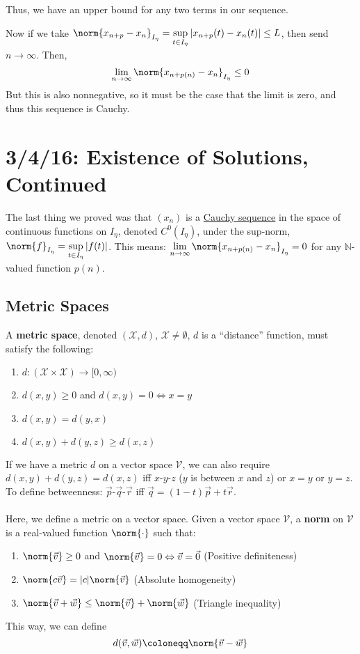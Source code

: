 \documentclass[12pt]{article}
\begin{document}
Thus, we have an upper bound for any two terms in our sequence.

Now if we take $\norm{x_{n+p} - x_n}_{I_{\eta}} = \displaystyle\sup_{t\in I_{\eta}}|x_{n+p}(t) - x_n(t)| \le L$, then send $n \to \infty$. Then, \[ \lim_{n \to \infty}\norm{x_{n+p(n)} - x_n}_{I_{\eta}} \le 0 \]
But this is also nonnegative, so it must be the case that the limit is zero, and thus this sequence is Cauchy.

\section{3/4/16: Existence of Solutions, Continued}
The last thing we proved was that $(x_n)$ is a \underline{Cauchy sequence} in the space of continuous functions on $I_{\eta}$, denoted $C^0(I_{\eta})$, under the sup-norm, $\norm{f}_{I_{\eta}} = \displaystyle\sup_{t \in I_{\eta}}|f(t)|$. This means: $\displaystyle\lim_{n \to \infty} \norm{x_{n+p(n)} - x_n}_{I_{\eta}} = 0$ for any $\mathbb{N}$-valued function $p(n)$.

\subsection{Metric Spaces}
\begin{definition}
A \textbf{metric space}, denoted $(\mathscr{X},d)$, $\mathscr{X}\neq \emptyset$, $d$ is a ``distance'' function, must satisfy the following:
\begin{enumerate}
\item $d:(\mathscr{X}\times \mathscr{X}) \to [0,\infty)$
\item $d(x,y) \ge 0$ and $d(x,y) = 0 \Leftrightarrow x=y$
\item $d(x,y) = d(y,x)$
\item $d(x,y) + d(y,z) \ge d(x,z)$
\end{enumerate}
\end{definition}

If we have a metric $d$ on a vector space $\mathcal{V}$, we can also require $d(x,y) + d(y,z) = d(x,z)$ iff $x\text{-}y\text{-}z$ ($y$ is between $x$ and $z$) or $x=y$ or $y=z$. To define betweenness: $\vec{p}\text{-}\vec{q}\text{-}\vec{r}$ iff $\vec{q} = (1-t)\vec{p} + t\vec{r}$. \\ \\
Here, we define a metric on a vector space. Given a vector space $\mathcal{V}$, a \textbf{norm} on $\mathcal{V}$ is a real-valued function $\norm{\cdot}$ such that:
\begin{enumerate}
\item $\norm{\vec{v}} \ge 0$ and $\norm{\vec{v}} = 0 \Leftrightarrow \vec{v} = \vec{0}$ (Positive definiteness)
\item $\norm{c\vec{v}} = |c|\norm{\vec{v}}$ (Absolute homogeneity)
\item $\norm{\vec{v} + \vec{w}} \le \norm{\vec{v}} + \norm{\vec{w}}$ (Triangle inequality)
\end{enumerate}
This way, we can define \[ d(\vec{v},\vec{w}) \coloneqq \norm{\vec{v} - \vec{w}} \]
\end{document}

